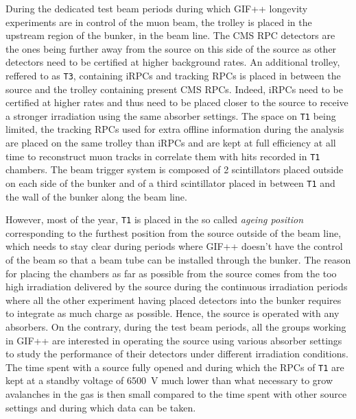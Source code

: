 	During the dedicated test beam periods during which GIF++ longevity experiments are in control of the muon beam, the trolley is placed in the upstream region of the bunker, in the beam line. The CMS RPC detectors are the ones being further away from the source on this side of the source as other detectors need to be certified at higher background rates. An additional trolley, reffered to as \texttt{T3}, containing iRPCs and tracking RPCs is placed in between the source and the trolley containing present CMS RPCs. Indeed, iRPCs need to be certified at higher rates and thus need to be placed closer to the source to receive a stronger irradiation using the same absorber settings. The space on \texttt{T1} being limited, the tracking RPCs used for extra offline information during the analysis are placed on the same trolley than iRPCs and are kept at full efficiency at all time to reconstruct muon tracks in correlate them with hits recorded in \texttt{T1} chambers. The beam trigger system is composed of 2 scintillators placed outside on each side of the bunker and of a third scintillator placed in between \texttt{T1} and the wall of the bunker along the beam line.
	
	However, most of the year, \texttt{T1} is placed in the so called \textit{ageing position} corresponding to the furthest position from the source outside of the beam line, which needs to stay clear during periods where GIF++ doesn't have the control of the beam so that a beam tube can be installed through the bunker. The reason for placing the chambers as far as possible from the source comes from the too high irradiation delivered by the source during the continuous irradiation periods where all the other experiment having placed detectors into the bunker requires to integrate as much charge as possible. Hence, the source is operated with any absorbers. On the contrary, during the test beam periods, all the groups working in GIF++ are interested in operating the source using various absorber settings to study the performance of their detectors under different irradiation conditions. The time spent with a source fully opened and during which the RPCs of \texttt{T1} are kept at a standby voltage of \SI{6500}{V} much lower than what necessary to grow avalanches in the gas is then small compared to the time spent with other source settings and during which data can be taken.
	
